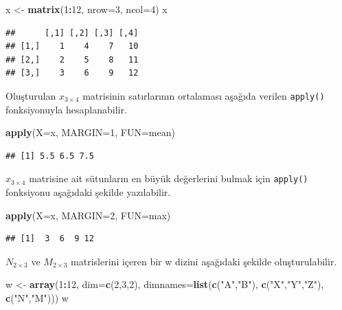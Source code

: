 \documentclass[
]{book}
\newenvironment{Shaded}{\begin{snugshade}}{\end{snugshade}}
\newcommand{\AttributeTok}[1]{\textcolor[rgb]{0.13,0.29,0.53}{#1}}
\newcommand{\DecValTok}[1]{\textcolor[rgb]{0.00,0.00,0.81}{#1}}
\newcommand{\FunctionTok}[1]{\textcolor[rgb]{0.13,0.29,0.53}{\textbf{#1}}}
\newcommand{\NormalTok}[1]{#1}
\newcommand{\OtherTok}[1]{\textcolor[rgb]{0.56,0.35,0.01}{#1}}
\newcommand{\SpecialCharTok}[1]{\textcolor[rgb]{0.81,0.36,0.00}{\textbf{#1}}}
\newcommand{\StringTok}[1]{\textcolor[rgb]{0.31,0.60,0.02}{#1}}
\begin{document}
\begin{Shaded}
\begin{Highlighting}[]
\NormalTok{x }\OtherTok{\textless{}{-}} \FunctionTok{matrix}\NormalTok{(}\DecValTok{1}\SpecialCharTok{:}\DecValTok{12}\NormalTok{, }\AttributeTok{nrow=}\DecValTok{3}\NormalTok{, }\AttributeTok{ncol=}\DecValTok{4}\NormalTok{)}
\NormalTok{x}
\end{Highlighting}
\end{Shaded}

\begin{verbatim}
##      [,1] [,2] [,3] [,4]
## [1,]    1    4    7   10
## [2,]    2    5    8   11
## [3,]    3    6    9   12
\end{verbatim}

Oluşturulan \(x_{3×4}\) matrisinin satırlarının ortalaması aşağıda verilen \texttt{apply()} fonksiyonuyla hesaplanabilir.

\begin{Shaded}
\begin{Highlighting}[]
\FunctionTok{apply}\NormalTok{(}\AttributeTok{X=}\NormalTok{x, }\AttributeTok{MARGIN=}\DecValTok{1}\NormalTok{, }\AttributeTok{FUN=}\NormalTok{mean)}
\end{Highlighting}
\end{Shaded}

\begin{verbatim}
## [1] 5.5 6.5 7.5
\end{verbatim}

\(x_{3×4}\) matrisine ait sütunların en büyük değerlerini bulmak için \texttt{apply()} fonksiyonu aşağıdaki şekilde yazılabilir.

\begin{Shaded}
\begin{Highlighting}[]
\FunctionTok{apply}\NormalTok{(}\AttributeTok{X=}\NormalTok{x, }\AttributeTok{MARGIN=}\DecValTok{2}\NormalTok{, }\AttributeTok{FUN=}\NormalTok{max)}
\end{Highlighting}
\end{Shaded}

\begin{verbatim}
## [1]  3  6  9 12
\end{verbatim}

\(N_{2×3}\) ve \(M_{2×3}\) matrislerini içeren bir w dizini aşağıdaki şekilde oluşturulabilir.

\begin{Shaded}
\begin{Highlighting}[]
\NormalTok{w }\OtherTok{\textless{}{-}} \FunctionTok{array}\NormalTok{(}\DecValTok{1}\SpecialCharTok{:}\DecValTok{12}\NormalTok{, }\AttributeTok{dim=}\FunctionTok{c}\NormalTok{(}\DecValTok{2}\NormalTok{,}\DecValTok{3}\NormalTok{,}\DecValTok{2}\NormalTok{), }\AttributeTok{dimnames=}\FunctionTok{list}\NormalTok{(}\FunctionTok{c}\NormalTok{(}\StringTok{"A"}\NormalTok{,}\StringTok{"B"}\NormalTok{), }\FunctionTok{c}\NormalTok{(}\StringTok{"X"}\NormalTok{,}\StringTok{"Y"}\NormalTok{,}\StringTok{"Z"}\NormalTok{),    }
           \FunctionTok{c}\NormalTok{(}\StringTok{"N"}\NormalTok{,}\StringTok{"M"}\NormalTok{)))}
\NormalTok{w}
\end{Highlighting}
\end{Shaded}
\end{document}

